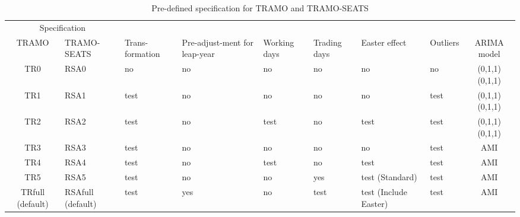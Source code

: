 \documentclass[article]{jss}
\begin{document}
\begin{table}

\caption{\label{tab:pre_def_ts}Pre-defined specification for TRAMO and TRAMO-SEATS}
\centering
\fontsize{7}{9}\selectfont
\begin{tabular}[t]{c>{\centering\arraybackslash}p{}>{\centering\arraybackslash}p{}>{\centering\arraybackslash}p{1.5cm}>{\centering\arraybackslash}p{0.9cm}>{\centering\arraybackslash}p{0.9cm}>{\centering\arraybackslash}p{1.5cm}>{\centering\arraybackslash}p{0.9cm}c}
\toprule
\multicolumn{2}{c}{Specification} & \multicolumn{1}{c}{} \\
\cmidrule(l{2pt}r{2pt}){1-2}
TRAMO & TRAMO-SEATS & Trans-formation & Pre-adjust-ment for leap-year & Working days & Trading days & Easter effect & Outliers & ARIMA model\\
\midrule
TR0 & RSA0 & no & no & no & no & no & no & (0,1,1)(0,1,1)\\
TR1 & RSA1 & test & no & no & no & no & test & (0,1,1)(0,1,1)\\
TR2 & RSA2 & test & no & test & no & test & test & (0,1,1)(0,1,1)\\
TR3 & RSA3 & test & no & no & no & no & test & AMI\\
TR4 & RSA4 & test & no & test & no & test & test & AMI\\
\addlinespace
TR5 & RSA5 & test & no & no & yes & test (Standard) & test & AMI\\
TRfull (default) & RSAfull (default) & test & yes & no & test & test (Include Easter) & test & AMI\\
\bottomrule
\end{tabular}
\end{table}
\end{document}
